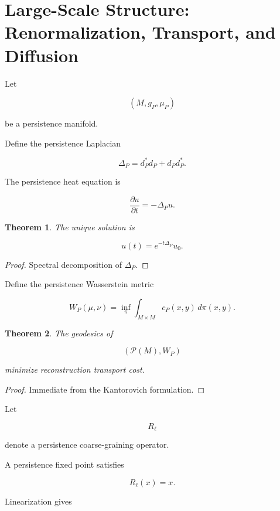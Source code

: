 \documentclass[12pt,oneside]{article}
\newtheorem{theorem}{Theorem}[section] \newtheorem{lemma}[theorem]{Lemma} \newtheorem{proposition}[theorem]{Proposition} \newtheorem{corollary}[theorem]{Corollary}
\theoremstyle{definition}
\begin{document}
\section{Large-Scale Structure: Renormalization, Transport, and Diffusion}

Let

\[
(M,g_P,\mu_P)
\]

be a persistence manifold.

Define the persistence Laplacian

\[
\Delta_P
=
d_P^\ast d_P
+
d_P d_P^\ast.
\]

The persistence heat equation is

\[
\frac{\partial u}{\partial t}
=
-\Delta_P u.
\]

\begin{theorem}

The unique solution is

\[
u(t)
=
e^{-t\Delta_P}u_0.
\]

\end{theorem}

\begin{proof}

Spectral decomposition of \(\Delta_P\).

\end{proof}

Define the persistence Wasserstein metric

\[
W_P(\mu,\nu)
=
\inf_{\pi}
\int_{M\times M}
c_P(x,y)
\,d\pi(x,y).
\]

\begin{theorem}

The geodesics of

\[
(\mathcal P(M),W_P)
\]

minimize reconstruction transport cost.

\end{theorem}

\begin{proof}

Immediate from the Kantorovich formulation.

\end{proof}

Let

\[
R_\ell
\]

denote a persistence coarse-graining operator.

A persistence fixed point satisfies

\[
R_\ell(x)=x.
\]

Linearization gives
\end{document}
